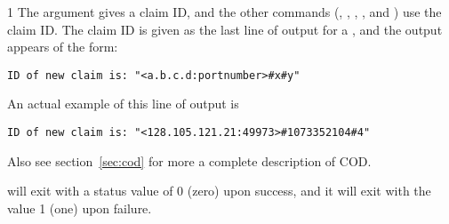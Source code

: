 \begin{ManPage}{\label{man-condor-cod}}{1}
The  argument gives a claim ID, and the other 
commands (, , , ,
and ) use the claim ID.
The claim ID is given as the last line of output for a ,
and the output appears of the form:
\footnotesize
\begin{verbatim}
ID of new claim is: "<a.b.c.d:portnumber>#x#y"
\end{verbatim}
\normalsize
An actual example of this line of output is 
\footnotesize
\begin{verbatim}
ID of new claim is: "<128.105.121.21:49973>#1073352104#4"
\end{verbatim}
\normalsize

Also see
section~\ref{sec:cod}
for more a complete description of COD.

\begin{Options}
  \ToolArgsBaseDesc
  \ToolLocateDesc
\end{Options}

\GenRem

\Examples

\ExitStatus

 will exit with a status value of 0 (zero) upon success,
and it will exit with the value 1 (one) upon failure.

\end{ManPage}
